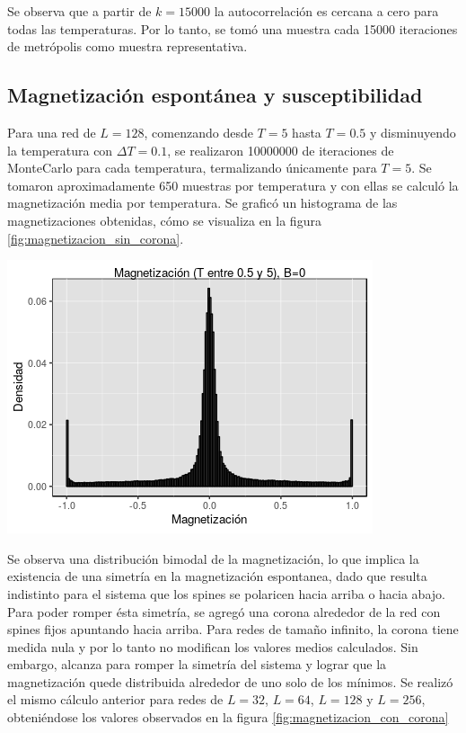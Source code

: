 \documentclass[%
 reprint,
 amsmath,amssymb,
 aps,
spanish]{revtex4-1}
\begin{document}
Se observa que a partir de $k=15000$ la autocorrelación es cercana a cero para todas las temperaturas. Por lo tanto, se tomó una muestra cada 15000 iteraciones de metrópolis como muestra representativa.

\subsection{Magnetización espontánea y susceptibilidad}
Para una red de $L=128$, comenzando desde $T=5$ hasta $T=0.5$ y disminuyendo la temperatura con $\Delta T=0.1$, se realizaron 10000000 de iteraciones de MonteCarlo para cada temperatura, termalizando únicamente para $T=5$. Se tomaron aproximadamente 650 muestras por temperatura y con ellas se calculó la magnetización media por temperatura. Se graficó un histograma de las magnetizaciones obtenidas, cómo se visualiza en la figura \ref{fig:magnetizacion_sin_corona}.   

\begin{minipage}{0.45\textwidth}									
\centering
\includegraphics[totalheight=0.25\textheight]{imagenes/sin_corona/magnetizacion.png}
\label{fig:magnetizacion_sin_corona}
\end{minipage}

Se observa una distribución bimodal de la magnetización, lo que implica la existencia de una simetría en la magnetización espontanea, dado que resulta indistinto para el sistema que los spines se polaricen hacia arriba o hacia abajo.\\
Para poder romper ésta simetría, se agregó una corona alrededor de la red con spines fijos apuntando hacia arriba. Para redes de tamaño infinito, la corona tiene medida nula y por lo tanto no modifican los valores medios calculados. Sin embargo, alcanza para romper la simetría del sistema y lograr que la magnetización quede distribuida alrededor de uno solo de los mínimos.
Se realizó el mismo cálculo anterior para redes de $L=32$, $L=64$, $L=128$ y $L=256$, obteniéndose los valores observados en la figura \ref{fig:magnetizacion_con_corona}
\end{document}
